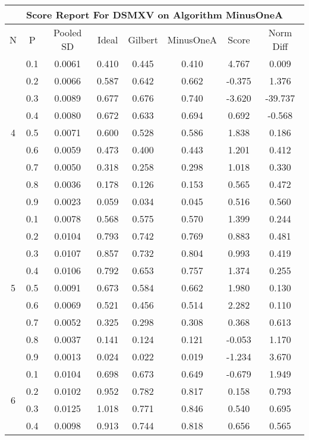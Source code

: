 \documentclass[11pt,a4paper]{report}
\begin{document}
\begin{longtable}{ | c | c || c | c | c | c | c | c | }
\hline
\multicolumn{8}{|c|}{ Score Report For DSMXV on Algorithm MinusOneA} \\
\hline
N & P & Pooled SD &  Ideal &  Gilbert & MinusOneA  & Score & Norm Diff \\
 \hline
 \hline
 \endhead
\multirow{9}{*}{4} & 0.1 & 0.0061 & 0.410 & 0.445 & 0.410 & 4.767 & 0.009 \\
 & 0.2 & 0.0066 & 0.587 & 0.642 & 0.662 & -0.375 & 1.376 \\
 & 0.3 & 0.0089 & 0.677 & 0.676 & 0.740 & -3.620 & -39.737 \\
 & 0.4 & 0.0080 & 0.672 & 0.633 & 0.694 & 0.692 & -0.568 \\
 & 0.5 & 0.0071 & 0.600 & 0.528 & 0.586 & 1.838 & 0.186 \\
 & 0.6 & 0.0059 & 0.473 & 0.400 & 0.443 & 1.201 & 0.412 \\
 & 0.7 & 0.0050 & 0.318 & 0.258 & 0.298 & 1.018 & 0.330 \\
 & 0.8 & 0.0036 & 0.178 & 0.126 & 0.153 & 0.565 & 0.472 \\
 & 0.9 & 0.0023 & 0.059 & 0.034 & 0.045 & 0.516 & 0.560 \\
 \hline
\multirow{9}{*}{5} & 0.1 & 0.0078 & 0.568 & 0.575 & 0.570 & 1.399 & 0.244 \\
 & 0.2 & 0.0104 & 0.793 & 0.742 & 0.769 & 0.883 & 0.481 \\
 & 0.3 & 0.0107 & 0.857 & 0.732 & 0.804 & 0.993 & 0.419 \\
 & 0.4 & 0.0106 & 0.792 & 0.653 & 0.757 & 1.374 & 0.255 \\
 & 0.5 & 0.0091 & 0.673 & 0.584 & 0.662 & 1.980 & 0.130 \\
 & 0.6 & 0.0069 & 0.521 & 0.456 & 0.514 & 2.282 & 0.110 \\
 & 0.7 & 0.0052 & 0.325 & 0.298 & 0.308 & 0.368 & 0.613 \\
 & 0.8 & 0.0037 & 0.141 & 0.124 & 0.121 & -0.053 & 1.170 \\
 & 0.9 & 0.0013 & 0.024 & 0.022 & 0.019 & -1.234 & 3.670 \\
 \hline
\multirow{9}{*}{6} & 0.1 & 0.0104 & 0.698 & 0.673 & 0.649 & -0.679 & 1.949 \\
 & 0.2 & 0.0102 & 0.952 & 0.782 & 0.817 & 0.158 & 0.793 \\
 & 0.3 & 0.0125 & 1.018 & 0.771 & 0.846 & 0.540 & 0.695 \\
 & 0.4 & 0.0098 & 0.913 & 0.744 & 0.818 & 0.656 & 0.565 \\

\end{longtable}
\end{document}
